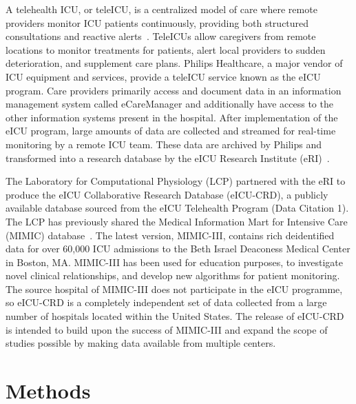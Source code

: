 \documentclass[english]{article}
\begin{document}
A telehealth ICU, or teleICU, is a centralized model of care where remote providers monitor ICU patients continuously, providing both structured consultations and reactive alerts~\cite{lilly2014multicenter}. TeleICUs allow caregivers from remote locations to monitor treatments for patients, alert local providers to sudden deterioration, and supplement care plans.
Philips Healthcare, a major vendor of ICU equipment and services, provide a teleICU service known as the eICU program.
Care providers primarily access and document data in an information management system called eCareManager and additionally have access to the other information systems present in the hospital.
After implementation of the eICU program, large amounts of data are collected and streamed for real-time monitoring by a remote ICU team.
These data are archived by Philips and transformed into a research database by the eICU Research Institute (eRI)~\cite{mcshea2010eicu}.


The Laboratory for Computational Physiology (LCP) partnered with the eRI to produce the eICU Collaborative Research Database (eICU-CRD), a publicly available database sourced from the eICU Telehealth Program (Data Citation 1).
The LCP has previously shared the Medical Information Mart for Intensive Care (MIMIC) database~\cite{MIMIC2011, MIMIC2016}. The latest version, MIMIC-III, contains rich deidentified data for over 60,000 ICU admissions to the Beth Israel Deaconess Medical Center in Boston, MA. MIMIC-III has been used for education purposes, to investigate novel clinical relationships, and develop new algorithms for patient monitoring. The source hospital of MIMIC-III does not participate in the eICU programme, so eICU-CRD is a completely independent set of data collected from a large number of hospitals located within the United States. The release of eICU-CRD is intended to build upon the success of MIMIC-III and expand the scope of studies possible by making data available from multiple centers.

\section*{Methods}

\end{document}
